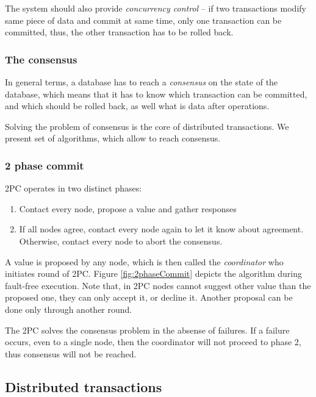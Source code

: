 The system should also provide \emph{concurrency control} -- if two transactions modify same piece of data and commit at same time, only one transaction can be committed, 
thus, the other transaction has to be rolled back.


\subsubsection{The consensus}
In general terms, a database has to reach a \emph{consensus} on the state of the database, which means that it has to know which transaction can be committed, and which should be rolled back, as well what is data after operations.

Solving the problem of consensus is the core of distributed transactions. We present set of algorithms, which allow to reach consensus.

\subsubsection{2 phase commit}
2PC \cite{2phaseC}  operates in two distinct phases:
\begin{enumerate}
\item Contact every node, propose a value and gather responses
\item If all nodes agree, contact every node again to let it know about agreement. Otherwise, contact every node to abort the consensus.
\end{enumerate}

A value is proposed by any node, which is then called the \emph{coordinator} who initiates round of 2PC.
Figure \ref{fig:2phaseCommit} depicts the algorithm during fault-free execution. Note that, in 2PC nodes cannot suggest other value than the proposed one, they can only accept it, or decline it. Another proposal can be done only through another round.

The 2PC solves the consensus problem in the absense of failures. If a failure occurs, even to a single node, then the coordinator will not proceed to phase 2, thus consensus will not be reached.





\subsection{Distributed transactions}


